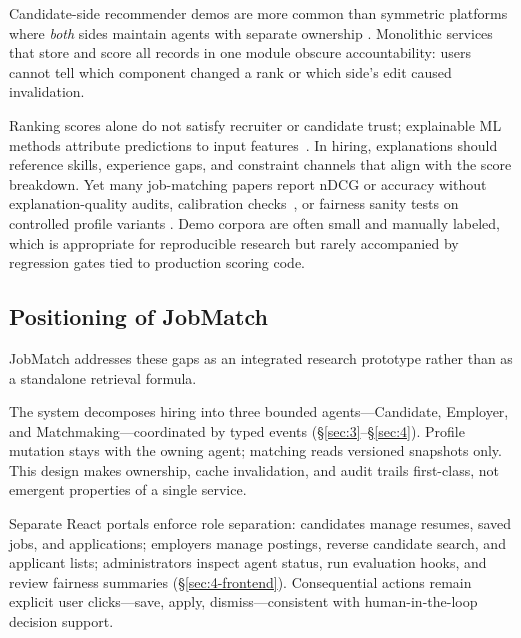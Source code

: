 Candidate-side recommender demos are more common than symmetric platforms where \emph{both} sides maintain agents with separate ownership .
Monolithic services that store and score all records in one module obscure accountability: users cannot tell which component changed a rank or which side's edit caused invalidation.

Ranking scores alone do not satisfy recruiter or candidate trust; explainable ML methods attribute predictions to input features~\cite{Ribeiro2016}.
In hiring, explanations should reference skills, experience gaps, and constraint channels that align with the score breakdown.
Yet many job-matching papers report nDCG or accuracy without explanation-quality audits, calibration checks~\cite{Platt1999}, or fairness sanity tests on controlled profile variants .
Demo corpora are often small and manually labeled, which is appropriate for reproducible research but rarely accompanied by regression gates tied to production scoring code.

\subsection{Positioning of JobMatch}\label{sec:2-positioning}

JobMatch addresses these gaps as an integrated research prototype rather than as a standalone retrieval formula.

The system decomposes hiring into three bounded agents---Candidate, Employer, and Matchmaking---coordinated by typed events (\S\ref{sec:3}--\S\ref{sec:4}).
Profile mutation stays with the owning agent; matching reads versioned snapshots only.
This design makes ownership, cache invalidation, and audit trails first-class, not emergent properties of a single service.

Separate React portals enforce role separation: candidates manage resumes, saved jobs, and applications; employers manage postings, reverse candidate search, and applicant lists; administrators inspect agent status, run evaluation hooks, and review fairness summaries (\S\ref{sec:4-frontend}).
Consequential actions remain explicit user clicks---save, apply, dismiss---consistent with human-in-the-loop decision support.


